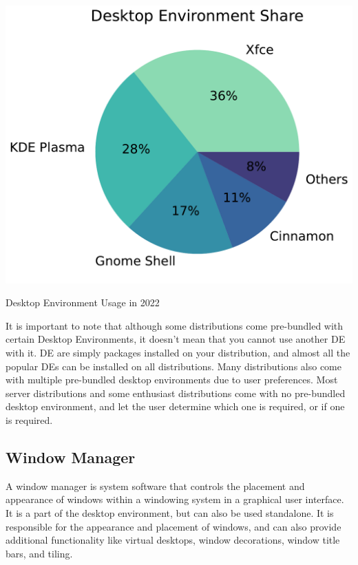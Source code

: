 \begin{marginfigure}
	\includegraphics{images/pdf/de-chart.pdf}
	\caption[Desktop Environment Usage]{Desktop Environment Usage in 2022}
\end{marginfigure}

It is important to note that although some distributions come pre-bundled with certain Desktop Environments, it doesn't mean that you cannot use another DE with it. DE are simply packages installed on your distribution, and almost all the popular DEs can be installed on all distributions. Many distributions also come with multiple pre-bundled desktop environments due to user preferences. Most server distributions and some enthusiast distributions come with no pre-bundled desktop environment, and let the user determine which one is required, or if one is required.

\subsection{Window Manager}

\begin{definition}
  A window manager is system software that controls the placement and appearance of windows within a windowing system in a graphical user interface. It is a part of the desktop environment, but can also be used standalone. It is responsible for the appearance and placement of windows, and can also provide additional functionality like virtual desktops, window decorations, window title bars, and tiling.
\end{definition}

